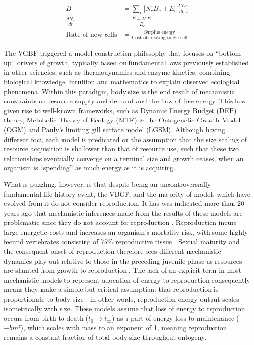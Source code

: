 \documentclass[a4paper]{article} %
\begin{document}
            \begin{align}
                B &= \sum_c \Bigg[N_{c}B_{c} + E_{c}\frac{dN_{c}}{dt}\Bigg] \\
                \frac{dN_{c}}{dt} &= \frac{B - N_{c}B_{c}}{E_{c}} \\
                \text{Rate of new cells} &= \frac{\text{Surplus energy}}{\text{Cost of creating single cell}}
            \end{align}
            
            The VGBF triggered a model-construction philosophy that focuses on ``bottom-up'' drivers of growth, typically based on fundamental laws previously established in other sciencies, such as thermodynamics and enzyme kinetics, combining biological knowledge, intuition and mathematics to explain observed ecological phenomena. Within this paradigm, body size is the end result of mechanistic constraints on resource supply and demand and the flow of free energy. This has given rise to well-known frameworks, such as Dynamic Energy Budget (DEB) theory, Metabolic Theory of Ecology (MTE) \& the Ontogenetic Growth Model (OGM) and Pauly's limiting gill surface model (LGSM). Although having different foci, each model is predicated on the assumption that the size scaling of resource acquisition is shallower than that of resource use, such that these two relationships eventually converge on a terminal size and growth ceases, when an organism is ``spending'' as much energy as it is acquiring. 
            
            What is puzzling, however, is that despite being an uncontroversially fundamental life history event, the VBGF, and the majority of models which have evolved from it do not consider reproduction. It has was indicated more than 20 years ago that mechanistic inferences made from the results of these models are problematic since they do not account for reproduction \autocite{Day1997, Marshall2019b}. Reproduction incurs large energetic costs and increases an organism's mortality risk, with some highly fecund vertebrates consisting of 75\% reproductive tissue \autocite{Parker2018}. Sexual maturity and the consequent onset of reproduction therefore sees different mechanistic dynamics play out relative to those in the preceding juvenile phase as resources are shunted from growth to reproduction \autocite{Day1997}. The lack of an explicit term in most mechanistic models to represent allocation of energy to reproduction consequently means they make a simple but critical assumption: that reproduction is proportionate to body size - in other words, reproduction energy output scales isometrically with size. These models assume that loss of energy to reproduction occurs from birth to death ($t_0 \rightarrow t_{\infty}$) as a part of energy loss to maintenance ($-bm^z$), which scales with mass to an exponent of 1, meaning reproduction remains a constant fraction of total body size throughout ontogeny.
\end{document}
